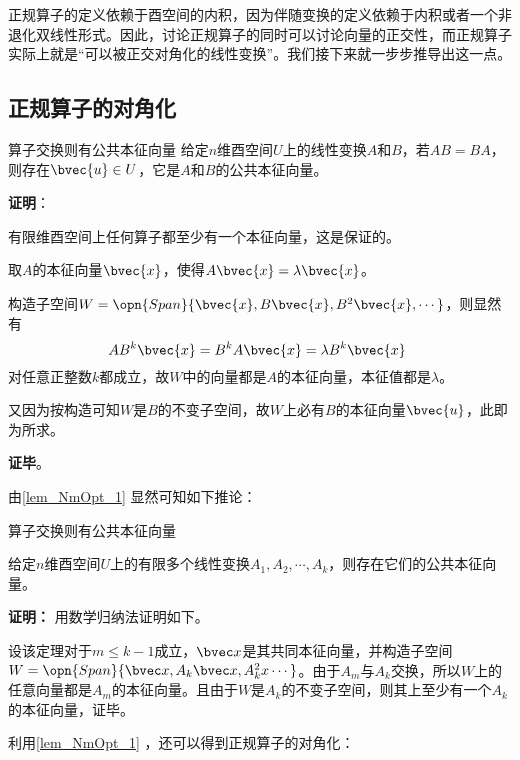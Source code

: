 正规算子的定义依赖于酉空间的内积，因为伴随变换的定义依赖于内积或者一个非退化双线性形式。因此，讨论正规算子的同时可以讨论向量的正交性，而正规算子实际上就是“可以被正交对角化的线性变换”。我们接下来就一步步推导出这一点。

\subsection{正规算子的对角化}

\begin{lemma}{算子交换则有公共本征向量}\label{lem_NmOpt_1}
给定$n$维酉空间$U$上的线性变换$A$和$B$，若$AB=BA$，则存在$\bvec{u}\in U$，它是$A$和$B$的公共本征向量。
\end{lemma}


\textbf{证明}：

有限维酉空间上任何算子都至少有一个本征向量，这是保证的。

取$A$的本征向量$\bvec{x}$，使得$A\bvec{x}=\lambda\bvec{x}$。

构造子空间$W=\opn{Span}\{\bvec{x}, B\bvec{x}, B^2\bvec{x}, \cdots\}$，则显然有
\begin{equation}
AB^k\bvec{x} = B^kA\bvec{x} = \lambda B^k\bvec{x}~
\end{equation}
对任意正整数$k$都成立，故$W$中的向量都是$A$的本征向量，本征值都是$\lambda$。

又因为按构造可知$W$是$B$的不变子空间，故$W$上必有$B$的本征向量$\bvec{u}$，此即为所求。

\textbf{证毕}。



由\autoref{lem_NmOpt_1} 显然可知如下推论：

\begin{corollary}{算子交换则有公共本征向量}\label{cor_NmOpt_1}

给定$n$维酉空间$U$上的有限多个线性变换$A_1, A_2, \cdots, A_k$，则存在它们的公共本征向量。

\end{corollary}
\textbf{证明：}
用数学归纳法证明如下。

设该定理对于$m\leq k-1$成立，$\bvec x$是其共同本征向量，并构造子空间$W=\opn{Span}\{\bvec x,A_{k}\bvec x,A_{k}^2x\cdots\}$。由于$A_m$与$A_k$交换，所以$W$上的任意向量都是$A_m$的本征向量。且由于$W$是$A_k$的不变子空间，则其上至少有一个$A_k$的本征向量，证毕。



利用\autoref{lem_NmOpt_1} ，还可以得到正规算子的对角化：


